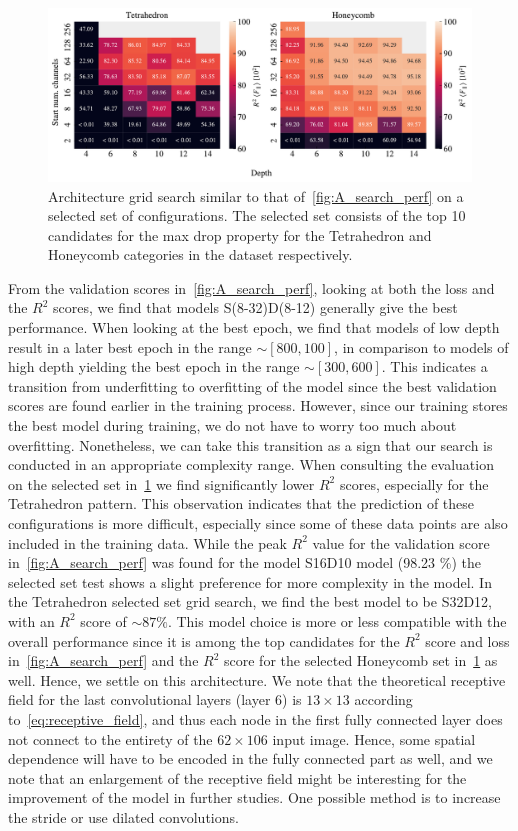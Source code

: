 \begin{figure}[!htb]
  \centering
  \includegraphics[width=0.88\linewidth]{figures/ML/A_search_compare_perf}
  \caption{Architecture grid search similar to that of~\cref{fig:A_search_perf} on a selected set of configurations. The selected set consists of the top 10 candidates for the max drop property for the Tetrahedron and Honeycomb categories in the dataset respectively.}
  \label{fig:A_search_compare}
\end{figure}  

From the validation scores in~\cref{fig:A_search_perf}, looking at both the loss
and the $R^2$ scores, we find that models S(8-32)D(8-12) generally give the best
performance. When looking at the best epoch, we find that models of low depth
result in a later best epoch in the range $\sim [800, 100]$, in comparison to
models of high depth yielding the best epoch in the range $\sim [300, 600]$.
This indicates a transition from underfitting to overfitting of the model since
the best validation scores are found earlier in the training process. However,
since our training stores the best model during training, we do not have to
worry too much about overfitting. Nonetheless, we can take this transition as a
sign that our search is conducted in an appropriate complexity range. When
consulting the evaluation on the selected set in~\cref{fig:A_search_compare} we
find significantly lower $R^2$ scores, especially for the Tetrahedron pattern.
This observation indicates that the prediction of these configurations is more
difficult, especially since some of these data points are also included in the
training data. While the peak $R^2$ value for the validation score
in~\cref{fig:A_search_perf} was found for the model S16D10 model (98.23 \%) the
selected set test shows a slight preference for more complexity in the model. In
the Tetrahedron selected set grid search, we find the best model to be S32D12,
with an $R^2$ score of $\sim 87 \%$. This model choice is more or less
compatible with the overall performance since it is among the top candidates for
the $R^2$ score and loss in~\cref{fig:A_search_perf} and the $R^2$ score for the
selected Honeycomb set in~\cref{fig:A_search_compare} as well. Hence, we settle
on this architecture. We note that the theoretical receptive field for the last
convolutional layers (layer 6) is $13 \times 13$ according to~\cref{eq:receptive_field}, and thus each node in the first fully connected
layer does not connect to the entirety of the $62\times106$ input image. Hence,
some spatial dependence will have to be encoded in the fully connected part as
well, and we note that an enlargement of the receptive field might be interesting for the improvement of the model in further studies. One possible method is to increase the stride or use dilated convolutions.

